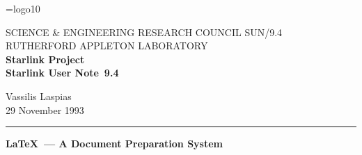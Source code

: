 \pagestyle{myheadings}

\newcommand{\stardoccategory}  {Starlink User Note}
\newcommand{\stardocinitials}  {SUN}
\newcommand{\stardocnumber}    {9.4}
\newcommand{\stardocauthors}   {Vassilis Laspias}
\newcommand{\stardocdate}      {29 November 1993}
\newcommand{\stardoctitle}     {\LaTeX\ --- A Document Preparation System}

\newcommand{\stardocname}{\stardocinitials /\stardocnumber}
\renewcommand{\_}{{\tt\char'137}}     %
\markright{\stardocname}
\setlength{\textwidth}{160mm}
\setlength{\textheight}{230mm}
\setlength{\topmargin}{-2mm}
\setlength{\oddsidemargin}{0mm}
\setlength{\evensidemargin}{0mm}
\setlength{\parindent}{0mm}
\setlength{\parskip}{\medskipamount}
\setlength{\unitlength}{1mm}


\newcommand{\BibTeX}{{\rm B\kern-0.05em{\sc i\kern-0.025em b}\kern-0.08em
    T\kern-0.1667em\lower0.7ex\hbox{E}\kern-0.125emX}}
\newcommand\bs{\char '134 }  %
\newcommand{\GloTeX}{{\rm G\kern-0.05em{\sc l\kern-0.025em o}\kern-0.08em
    T\kern-0.1667em\lower0.7ex\hbox{E}\kern-0.125emX}}
\newcommand{\IdxTeX}{{\rm I\kern-0.05em{\sc d\kern-0.025em x}\kern-0.08em
    T\kern-0.1667em\lower0.7ex\hbox{E}\kern-0.125emX}}
\newcommand{\TeXPS}{{\TeX\kern-.1667em\raise-.5ex\hbox{P}\kern-.125emS}}
\def\PS{{\sc Post\-Script}}
\font\tenlogo=logo10
\def\MF{{\tenlogo META}\-{\tenlogo FONT}}
\def\indexindent{\par\hangindent 50pt\hspace*{40pt}}
\def\tilde{\char126\relax}
\def\endverb{\par\endgroup}
\def\begverb#1{\begingroup\def\par{\leavevmode\endgraf}
\catcode`\\=12\catcode`\{=12
\catcode`\}=12\catcode`\$=12\catcode`\&=12
\catcode`\#=12\catcode`\%=12\catcode`\~=12
\catcode`\_=12\catcode`\^=12\obeyspaces\obeylines\tt
\parindent=0pt\catcode#1=0}


\thispagestyle{empty}
SCIENCE \& ENGINEERING RESEARCH COUNCIL \hfill \stardocname\\
RUTHERFORD APPLETON LABORATORY\\
{\large\bf Starlink Project\\}
{\large\bf \stardoccategory\ \stardocnumber}
\begin{flushright}
\stardocauthors\\
\stardocdate
\end{flushright}
\vspace{-4mm}
\rule{\textwidth}{0.5mm}
\vspace{5mm}
\begin{center}
{\Large\bf \stardoctitle}
\end{center}
\vspace{5mm}

